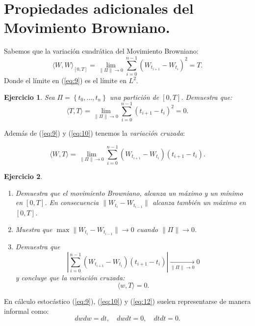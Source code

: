 \documentclass{article}
\newtheorem{ejercicio}{Ejercicio}
\begin{document}
\section{Propiedades adicionales del Movimiento Browniano.}
Sabemos que la variación cuadrática del Movimiento Browniano:
\begin{equation}\label{eq:9}
    \langle W, W\rangle_{[0,T]} = \lim_{\|\Pi\|\rightarrow 0}\sum_{i=0}^{n-1}\left(W_{t_{i+1}}-W_{t_i}\right)^2 = T.
\end{equation}
Donde el límite en (\ref{eq:9}) es el límite en $L^2$.
\begin{ejercicio}
    Sea $\Pi = \left\{t_0, \ldots,t_n\right\}$ una partición de $[0,T]$. Demuestra que:
    \begin{equation}\label{eq:10}
        \langle T, T\rangle = \lim_{\|\Pi\|\rightarrow 0}\sum_{i=0}^{n-1}\left(t_{i+1}-t_i\right)^2 = 0.
    \end{equation}
\end{ejercicio}
\par\noindent 
Además de (\ref{eq:9}) y (\ref{eq:10}) tenemos la \emph{variación cruzada}:

\begin{equation}\label{eq:11}
    \langle W, T\rangle = \lim_{\|\Pi\|\rightarrow 0}\sum_{i=0}^{n-1}\left(W_{t_{i+1}}-W_{t_i}\right)\left(t_{i+1}-t_i\right) .
\end{equation}
\begin{ejercicio}
    \par\noindent
    \begin{enumerate}
        \item Demuestra que el movimiento Browniano, alcanza un máximo y un mínimo en $[0,T]$. En consecuencia $\|W_{t_i}-W_{t_{i-1}}\|$ alcanza también un máximo en $[0,T]$.
        \item Muestra que $\max \|W_{t_i}-W_{t_{i-1}}\| \rightarrow 0$ cuando $\|\Pi\|\rightarrow 0$.
        \item Demuestra que 
        \begin{equation*}
            \left\vert\sum_{i=0}^{n-1}\left(W_{t_{i+1}}-W_{t_i}\right)\left(t_{i+1}-t_i\right)\right\vert \xrightarrow[\|\Pi\| \to 0]{} 0
        \end{equation*}
        y concluye que la variación cruzada: 
        \begin{equation}\label{eq:12}
            \langle w, T\rangle = 0.
        \end{equation}    
    \end{enumerate}
\end{ejercicio}
En cálculo estocástico (\ref{eq:9}), (\ref{eq:10})  y (\ref{eq:12}) suelen representarse de manera informal como:
$$
dwdw=dt, \quad dwdt = 0,  \quad dtdt = 0.
$$
\end{document}
